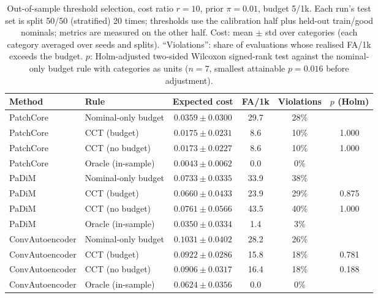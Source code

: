 \begin{table}[tbp]
\centering
\small
\caption{Out-of-sample threshold selection, cost ratio $r=10$, prior $\pi=0.01$, budget 5/1k. Each run's test set is split 50/50 (stratified) 20 times; thresholds use the calibration half plus held-out train/good nominals; metrics are measured on the other half. Cost: mean $\pm$ std over categories (each category averaged over seeds and splits). ``Violations'': share of evaluations whose realised FA/1k exceeds the budget. $p$: Holm-adjusted two-sided Wilcoxon signed-rank test against the nominal-only budget rule with categories as units ($n=7$, smallest attainable $p=0.016$ before adjustment).}
\label{tab:cct}
\begin{adjustbox}{max width=\linewidth}
\begin{tabular}{llcccc}
\toprule
\textbf{Method} & \textbf{Rule} & \textbf{Expected cost} & \textbf{FA/1k} & \textbf{Violations} & \textbf{$p$ (Holm)} \\
\midrule
PatchCore & Nominal-only budget & $0.0359 \pm 0.0300$ & 29.7 & 28\% &  \\
PatchCore & CCT (budget) & $0.0175 \pm 0.0231$ & 8.6 & 10\% & 1.000 \\
PatchCore & CCT (no budget) & $0.0173 \pm 0.0227$ & 8.6 & 10\% & 1.000 \\
PatchCore & Oracle (in-sample) & $0.0043 \pm 0.0062$ & 0.0 & 0\% &  \\
\midrule
PaDiM & Nominal-only budget & $0.0733 \pm 0.0335$ & 33.9 & 38\% &  \\
PaDiM & CCT (budget) & $0.0660 \pm 0.0433$ & 23.9 & 29\% & 0.875 \\
PaDiM & CCT (no budget) & $0.0761 \pm 0.0566$ & 43.5 & 40\% & 1.000 \\
PaDiM & Oracle (in-sample) & $0.0350 \pm 0.0334$ & 1.4 & 3\% &  \\
\midrule
ConvAutoencoder & Nominal-only budget & $0.1031 \pm 0.0402$ & 28.2 & 26\% &  \\
ConvAutoencoder & CCT (budget) & $0.0922 \pm 0.0286$ & 15.8 & 18\% & 0.781 \\
ConvAutoencoder & CCT (no budget) & $0.0906 \pm 0.0317$ & 16.4 & 18\% & 0.188 \\
ConvAutoencoder & Oracle (in-sample) & $0.0624 \pm 0.0356$ & 0.0 & 0\% &  \\
\bottomrule
\end{tabular}
\end{adjustbox}
\end{table}
